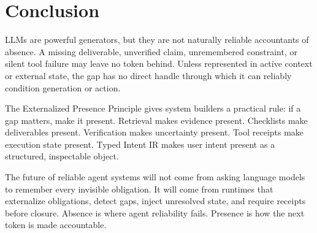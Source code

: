 \documentclass[10pt,conference]{IEEEtran}
\begin{document}
\section{Conclusion}
LLMs are powerful generators, but they are not naturally reliable accountants of absence. A missing deliverable, unverified claim, unremembered constraint, or silent tool failure may leave no token behind. Unless represented in active context or external state, the gap has no direct handle through which it can reliably condition generation or action.

The Externalized Presence Principle gives system builders a practical rule: if a gap matters, make it present. Retrieval makes evidence present. Checklists make deliverables present. Verification makes uncertainty present. Tool receipts make execution state present. Typed Intent IR makes user intent present as a structured, inspectable object.

The future of reliable agent systems will not come from asking language models to remember every invisible obligation. It will come from runtimes that externalize obligations, detect gaps, inject unresolved state, and require receipts before closure. Absence is where agent reliability fails. Presence is how the next token is made accountable.
\end{document}
